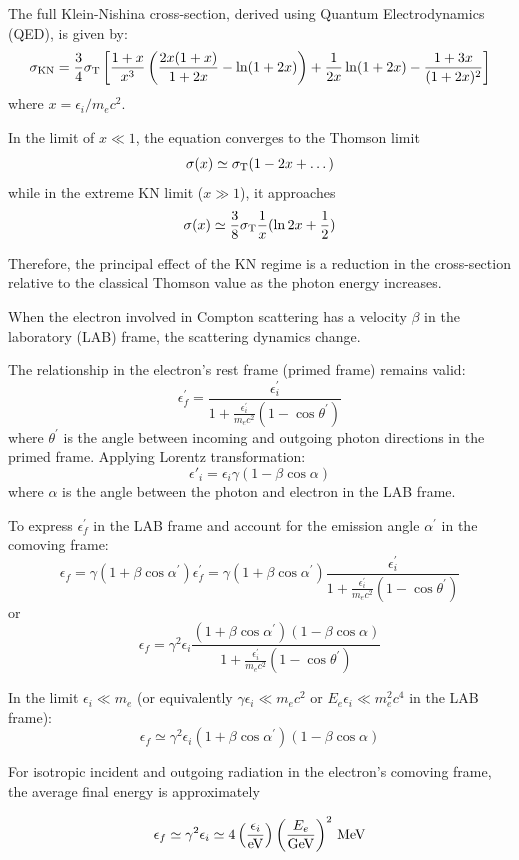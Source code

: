 The full Klein-Nishina cross-section, derived using Quantum Electrodynamics (QED), is given by:
%
\[
\sigma_{\rm KN} = \frac{3}{4} \sigma_{\rm T} \left[ \frac{1+x}{x^3} \left(\frac{2x(1+x)}{1+2x} - \ln (1+2x)\right) + \frac{1}{2x} \ln (1+2x) - \frac{1+3x}{(1+2x)^2} \right]
\]
%
where \( x = \epsilon_i / m_e c^2 \).

In the limit of \( x \ll 1 \), the equation converges to the Thomson limit \[ \sigma(x) \simeq \sigma_{\rm T} (1-2x+\dots) \] while in the extreme KN limit (\( x \gg 1 \)), it approaches \[ \sigma(x) \simeq \frac{3}{8} \sigma_{\rm T} \frac{1}{x} (\ln 2x + \frac{1}{2}) \]

Therefore, the principal effect of the KN regime is a reduction in the cross-section relative to the classical Thomson value as the photon energy increases.


When the electron involved in Compton scattering has a velocity \( \beta \) in the laboratory (LAB) frame, the scattering dynamics change.

The relationship in the electron's rest frame (primed frame) remains valid:
%
\[
\epsilon^\prime_f = \frac{\epsilon^\prime_i}{1+ \frac{\epsilon^\prime_i}{m_e c^2} (1-\cos\theta^\prime)}
\]
%
where \( \theta^\prime \) is the angle between incoming and outgoing photon directions in the primed frame. Applying Lorentz transformation:
%
\[
\epsilon'_i = \epsilon_i \gamma (1-\beta \cos \alpha)
\]
%
where \( \alpha \) is the angle between the photon and electron in the LAB frame.

To express \( \epsilon^\prime_f \) in the LAB frame and account for the emission angle \( \alpha^\prime \) in the comoving frame:
%
\[
\epsilon_f = \gamma(1+\beta \cos\alpha^\prime) \epsilon^\prime_f = 
\gamma (1+\beta \cos \alpha^\prime) \frac{\epsilon^\prime_i}{1+ \frac{\epsilon^\prime_i}{m_e c^2} (1-\cos\theta^\prime)}
\]
%
or
\[
\epsilon_f = \gamma^2 \epsilon_i \frac{(1+\beta \cos\alpha^\prime)(1-\beta \cos\alpha)}{1+ \frac{\epsilon^\prime_i}{m_e c^2} (1-\cos\theta^\prime)}
\]

In the limit \( \epsilon_i \ll m_e \) (or equivalently \( \gamma \epsilon_i \ll m_e c^2 \) or \( E_e \epsilon_i \ll m_e^2 c^4 \) in the LAB frame):
%
\[
\epsilon_f \simeq \gamma^2 \epsilon_i (1+\beta \cos\alpha^\prime)(1-\beta \cos\alpha)
\]

For isotropic incident and outgoing radiation in the electron's comoving frame, the average final energy is approximately 
%
\begin{remark}
\[
 \epsilon_f \simeq \gamma^2 \epsilon_i \simeq 4 \left(\frac{\epsilon_i}{\rm eV}\right)\left(\frac{E_e}{\rm GeV}\right)^2 \, \text{MeV}   
\]
\end{remark}

